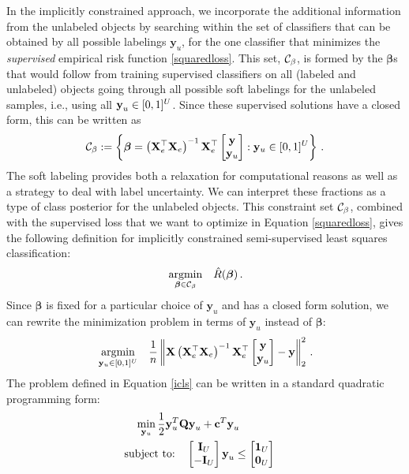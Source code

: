 \documentclass{elsarticle}
\begin{document}
In the implicitly constrained approach, we incorporate the additional information from the unlabeled objects by searching within the set of classifiers that can be obtained by all possible labelings $\textbf{y}_u$, for the one classifier that minimizes the \emph{supervised} empirical risk function \eqref{squaredloss}. This set, $\mathcal{C}_{\beta}$, is formed by the $\boldsymbol{\beta}$s that would follow from training supervised classifiers on all (labeled and unlabeled) objects going through all possible soft labelings for the unlabeled samples, i.e., using all $\textbf{y}_u \in [0,1]^{U}$. Since these supervised solutions have a closed form, this can be written as
\begin{equation} \label{constrainedregion}
\mathcal{C}_{\beta} := \left\{   \boldsymbol{\beta} = \left( {\mathbf{X}_e^{\top}} {\mathbf{X}_e} \right)^{-1} {\mathbf{X}_e^{\top}} \begin{bmatrix} \mathbf{y} \\ \mathbf{y}_u \end{bmatrix}: \mathbf{y}_u \in [0,1]^{U} \right\} \, .
\end{equation}
The soft labeling provides both a relaxation for computational reasons as well as a strategy to deal with label uncertainty. We can interpret these fractions as a type of class posterior for the unlabeled objects. 
This constraint set $\mathcal{C}_{\beta}$, combined with the supervised loss that we want to optimize in Equation \eqref{squaredloss}, gives the following definition for implicitly constrained semi-supervised least squares classification:
\begin{equation}
\begin{aligned}
&\operatorname*{argmin}_{\boldsymbol{\beta} \in \mathcal{C}_{\beta}} & \hat{R}(\boldsymbol{\beta}) \, .
\end{aligned}
\end{equation}
Since $\boldsymbol{\beta}$ is fixed for a particular choice of $\textbf{y}_u$ and has a closed form solution, we can rewrite the minimization problem in terms of $\textbf{y}_u$ instead of $\boldsymbol{\beta}$:
\begin{equation} \label{icls}
\begin{aligned}
& \operatorname*{argmin}_{\mathbf{y}_u \in [0,1]^{U}} & \frac{1}{n}  \left\|  \mathbf{X} \left(\mathbf{X}_e^{\top} \mathbf{X}_e \right)^{-1} \mathbf{X}_e^{\top} \begin{bmatrix} \mathbf{y} \\ \mathbf{y}_u \end{bmatrix} - \mathbf{y} \right\|_2^2 \, . \\ 
\end{aligned}
\end{equation}
The problem defined in Equation \eqref{icls} can be written in a standard quadratic programming  form:
\begin{equation}
\begin{aligned}
& \quad \min_{\mathbf{y}_u} \frac{1}{2} \textbf{y}_u^T  \textbf{Q}  \textbf{y}_u + \textbf{c}^T \textbf{y}_u   & \\
& \text{subject to:}  \quad \begin{bmatrix} \textbf{I}_{U}  \\ -\textbf{I}_{U} \end{bmatrix}  \textbf{y}_u \leq \begin{bmatrix} \textbf{1}_{U}  \\ \textbf{0}_{U} \end{bmatrix} & \\
\end{aligned}
\end{equation}
\end{document}

